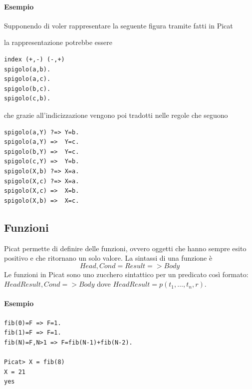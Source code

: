 \documentclass[12pt,a4paper,openright]{book} %
\begin{document}
\paragraph{Esempio}

Supponendo di voler rappresentare la seguente figura tramite fatti in
Picat
\begin{center}
\end{center}
la rappresentazione potrebbe essere
\begin{verbatim}
index (+,-) (-,+)
spigolo(a,b).
spigolo(a,c).
spigolo(b,c).
spigolo(c,b).
\end{verbatim}
che grazie all'indicizzazione vengono poi tradotti nelle regole che
seguono
\begin{verbatim}
spigolo(a,Y) ?=> Y=b.
spigolo(a,Y) =>  Y=c.
spigolo(b,Y) =>  Y=c.
spigolo(c,Y) =>  Y=b.
spigolo(X,b) ?=> X=a.
spigolo(X,c) ?=> X=a.
spigolo(X,c) =>  X=b.
spigolo(X,b) =>  X=c.
\end{verbatim}

\subsection{Funzioni}
\label{subsec:picat_base_func}

Picat permette di definire delle funzioni, ovvero oggetti che hanno
sempre esito positivo e che ritornano un solo valore. La sintassi di
una funzione è
\[
  Head, Cond = Result => Body
\]
Le funzioni in Picat
sono uno zucchero sintattico per un predicato così formato:
$HeadResult, Cond => Body$ dove $HeadResult = p(t_1, \ldots, t_n, r)$.

\paragraph{Esempio}
\begin{verbatim}
fib(0)=F => F=1.
fib(1)=F => F=1.
fib(N)=F,N>1 => F=fib(N-1)+fib(N-2).

Picat> X = fib(8)
X = 21
yes
\end{verbatim}
\end{document}
